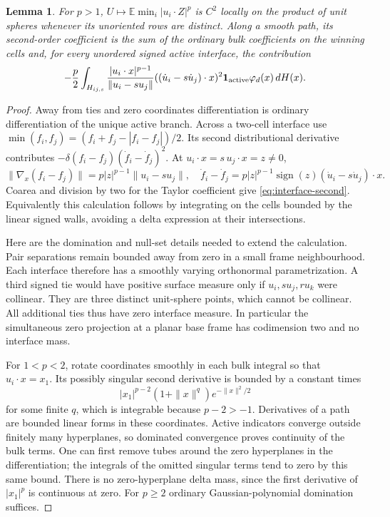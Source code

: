\documentclass[11pt,a4paper]{article}
\newtheorem{lemma}[theorem]{Lemma}
\theoremstyle{remark}\newtheorem{remark}[theorem]{Remark}
\newcommand{\E}{\mathbb E}
\begin{document}
\begin{lemma}\label{lem:C2}
For $p>1$, $U\mapsto\E\min_i|u_i\cdot Z|^p$ is $C^2$ locally on the product of unit spheres whenever its unoriented rows are distinct. Along a smooth path, its second-order coefficient is the sum of the ordinary bulk coefficients on the winning cells and, for every unordered signed active interface, the contribution
\begin{equation}\label{eq:interface-second}
 -\frac{p}{2}\int_{H_{ij,s}}
 \frac{|u_i\cdot x|^{p-1}}{\|u_i-su_j\|}
 ((\dot u_i-s\dot u_j)\cdot x)^2
 \mathbf1_{\rm active}\varphi_d(x)\,dH(x).
\end{equation}
\end{lemma}
\begin{proof}
Away from ties and zero coordinates differentiation is ordinary differentiation of the unique active branch. Across a two-cell interface use
$\min(f_i,f_j)=(f_i+f_j-|f_i-f_j|)/2$. Its second distributional derivative contributes
$-\delta(f_i-f_j)(\dot f_i-\dot f_j)^2$.
At $u_i\cdot x=s\,u_j\cdot x=z\ne0$,
\[
 \|\nabla_x(f_i-f_j)\|=p|z|^{p-1}\|u_i-su_j\|,\quad
 \dot f_i-\dot f_j
 =p|z|^{p-1}\operatorname{sign}(z)(\dot u_i-s\dot u_j)\cdot x.
\]
Coarea and division by two for the Taylor coefficient give
\eqref{eq:interface-second}. Equivalently this calculation follows by integrating on the cells bounded by the linear signed walls, avoiding a delta expression at their intersections.

Here are the domination and null-set details needed to extend the calculation. Pair separations remain bounded away from zero in a small frame neighbourhood. Each interface therefore has a smoothly varying orthonormal parametrization. A third signed tie would have positive surface measure only if $u_i,su_j,ru_k$ were collinear. They are three distinct unit-sphere points, which cannot be collinear. All additional ties thus have zero interface measure. In particular the simultaneous zero projection at a planar base frame has codimension two and no interface mass.

For $1<p<2$, rotate coordinates smoothly in each bulk integral so that $u_i\cdot x=x_1$. Its possibly singular second derivative is bounded by a constant times
\[
 |x_1|^{p-2}(1+\|x\|^q)e^{-\|x\|^2/2}
\]
for some finite $q$, which is integrable because $p-2>-1$. Derivatives of a path are bounded linear forms in these coordinates. Active indicators converge outside finitely many hyperplanes, so dominated convergence proves continuity of the bulk terms. One can first remove tubes around the zero hyperplanes in the differentiation; the integrals of the omitted singular terms tend to zero by this same bound. There is no zero-hyperplane delta mass, since the first derivative of $|x_1|^p$ is continuous at zero. For $p\ge2$ ordinary Gaussian-polynomial domination suffices.


\end{proof}
\end{document}
